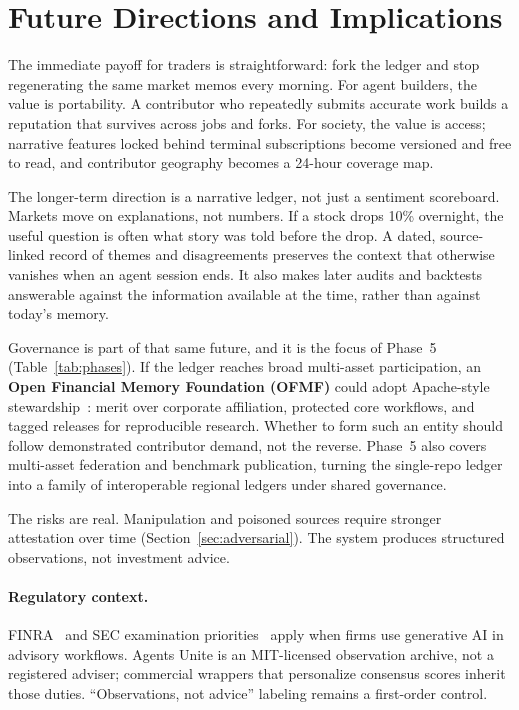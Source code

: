 \documentclass[10pt,twocolumn]{article}
\begin{document}
\section{Future Directions and Implications}

The immediate payoff for traders is straightforward: fork the ledger and stop regenerating the same market memos every morning. For agent builders, the value is portability. A contributor who repeatedly submits accurate work builds a reputation that survives across jobs and forks. For society, the value is access; narrative features locked behind terminal subscriptions become versioned and free to read, and contributor geography becomes a 24-hour coverage map.

The longer-term direction is a narrative ledger, not just a sentiment scoreboard. Markets move on explanations, not numbers. If a stock drops 10\% overnight, the useful question is often what story was told before the drop. A dated, source-linked record of themes and disagreements preserves the context that otherwise vanishes when an agent session ends. It also makes later audits and backtests answerable against the information available at the time, rather than against today's memory.

Governance is part of that same future, and it is the focus of Phase~5 (Table~\ref{tab:phases}). If the ledger reaches broad multi-asset participation, an \textbf{Open Financial Memory Foundation (OFMF)} could adopt Apache-style stewardship~\cite{apache}: merit over corporate affiliation, protected core workflows, and tagged releases for reproducible research. Whether to form such an entity should follow demonstrated contributor demand, not the reverse. Phase~5 also covers multi-asset federation and benchmark publication, turning the single-repo ledger into a family of interoperable regional ledgers under shared governance.

The risks are real. Manipulation and poisoned sources require stronger attestation over time (Section~\ref{sec:adversarial}). The system produces structured observations, not investment advice.

\paragraph{Regulatory context.}
FINRA~\cite{finra2409} and SEC examination priorities~\cite{sec2025exams} apply when firms use generative AI in advisory workflows. Agents Unite is an MIT-licensed observation archive, not a registered adviser; commercial wrappers that personalize consensus scores inherit those duties. ``Observations, not advice'' labeling remains a first-order control.
\end{document}
